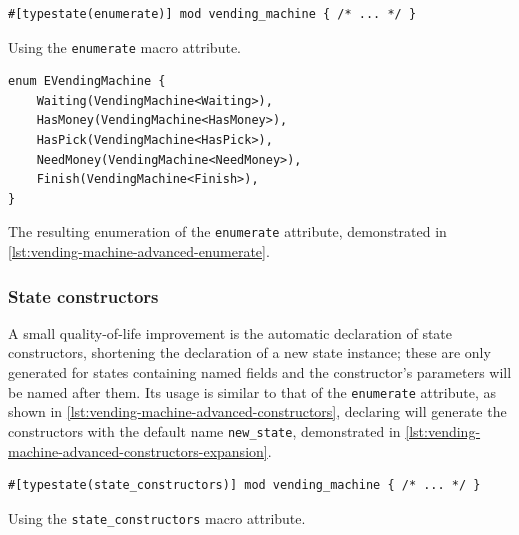 \begin{listing}
    \begin{verbatim}
#[typestate(enumerate)] mod vending_machine { /* ... */ }
    \end{verbatim}
    \caption{Using the \textcolor{attrgreen}{\texttt{enumerate}} macro attribute.}
    \label{lst:vending-machine-advanced-enumerate}
\end{listing}

\begin{listing}
    \begin{verbatim}
enum EVendingMachine {
    Waiting(VendingMachine<Waiting>),
    HasMoney(VendingMachine<HasMoney>),
    HasPick(VendingMachine<HasPick>),
    NeedMoney(VendingMachine<NeedMoney>),
    Finish(VendingMachine<Finish>),
}
    \end{verbatim}
    \caption{The resulting enumeration of the \textcolor{attrgreen}{\texttt{enumerate}} attribute, demonstrated in \autoref{lst:vending-machine-advanced-enumerate}.}
    \label{lst:vending-machine-advanced-enumerate-expansion}
\end{listing}

\subsubsection{State constructors}

A small quality-of-life improvement is the automatic declaration of state constructors,
shortening the declaration of a new state instance;
these are only generated for states containing named fields and
the constructor's parameters will be named after them. %
Its usage is similar to that of the \textcolor{attrgreen}{\texttt{enumerate}} attribute, as shown in \autoref{lst:vending-machine-advanced-constructors},
declaring \textcolor{attrgreen}{} will generate the constructors with the default name \texttt{new\_state},
demonstrated in \autoref{lst:vending-machine-advanced-constructors-expansion}.

\begin{listing}
    \begin{verbatim}
#[typestate(state_constructors)] mod vending_machine { /* ... */ }
    \end{verbatim}
    \caption{Using the \textcolor{attrgreen}{\texttt{state\_constructors}} macro attribute.}
    \label{lst:vending-machine-advanced-constructors}
\end{listing}


